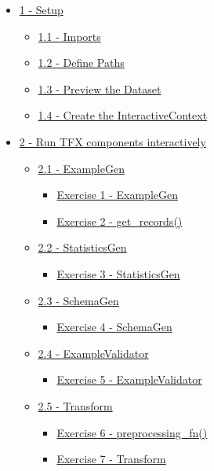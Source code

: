 \documentclass[11pt]{article}
\providecommand{\tightlist}{%
      \setlength{\itemsep}{0pt}\setlength{\parskip}{0pt}}
\begin{document}
\begin{itemize}
\tightlist
\item
  \hyperref[1]{1 - Setup}

  \begin{itemize}
  \tightlist
  \item
    \hyperref[1-1]{1.1 - Imports}
  \item
    \hyperref[1-2]{1.2 - Define Paths}
  \item
    \hyperref[1-3]{1.3 - Preview the Dataset}
  \item
    \hyperref[1-4]{1.4 - Create the InteractiveContext}
  \end{itemize}
\item
  \hyperref[2]{2 - Run TFX components interactively}

  \begin{itemize}
  \tightlist
  \item
    \hyperref[2-1]{2.1 - ExampleGen}

    \begin{itemize}
    \tightlist
    \item
      \hyperref[ex-1]{Exercise 1 - ExampleGen}
    \item
      \hyperref[ex-2]{Exercise 2 - get_records()}
    \end{itemize}
  \item
    \hyperref[2-2]{2.2 - StatisticsGen}

    \begin{itemize}
    \tightlist
    \item
      \hyperref[ex-3]{Exercise 3 - StatisticsGen}
    \end{itemize}
  \item
    \hyperref[2-3]{2.3 - SchemaGen}

    \begin{itemize}
    \tightlist
    \item
      \hyperref[ex-4]{Exercise 4 - SchemaGen}
    \end{itemize}
  \item
    \hyperref[2-4]{2.4 - ExampleValidator}

    \begin{itemize}
    \tightlist
    \item
      \hyperref[ex-5]{Exercise 5 - ExampleValidator}
    \end{itemize}
  \item
    \hyperref[2-5]{2.5 - Transform}

    \begin{itemize}
    \tightlist
    \item
      \hyperref[ex-6]{Exercise 6 - preprocessing_fn()}
    \item
      \hyperref[ex-7]{Exercise 7 - Transform}
    \end{itemize}
  \end{itemize}
\end{itemize}
\end{document}
